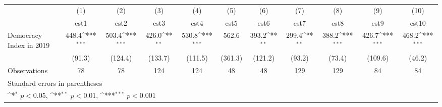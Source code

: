 {
\def\sym#1{\ifmmode^{#1}\else\(^{#1}\)\fi}
\begin{tabular}{l*{10}{c}}
\hline\hline
                    &\multicolumn{1}{c}{(1)}         &\multicolumn{1}{c}{(2)}         &\multicolumn{1}{c}{(3)}         &\multicolumn{1}{c}{(4)}         &\multicolumn{1}{c}{(5)}         &\multicolumn{1}{c}{(6)}         &\multicolumn{1}{c}{(7)}         &\multicolumn{1}{c}{(8)}         &\multicolumn{1}{c}{(9)}         &\multicolumn{1}{c}{(10)}         \\
                    &        est1         &        est2         &        est3         &        est4         &        est5         &        est6         &        est7         &        est8         &        est9         &       est10         \\
\hline
Democracy Index in 2019&       448.4\sym{***}&       503.4\sym{***}&       426.0\sym{**} &       530.8\sym{***}&       562.6         &       393.2\sym{**} &       299.4\sym{**} &       388.2\sym{***}&       426.7\sym{***}&       468.2\sym{***}\\
                    &      (91.3)         &     (124.4)         &     (133.7)         &     (111.5)         &     (361.3)         &     (121.2)         &      (93.2)         &      (73.4)         &     (109.6)         &      (46.2)         \\
\hline
Observations        &          78         &          78         &         124         &         124         &          48         &          48         &         129         &         129         &          84         &          84         \\
\hline\hline
\multicolumn{11}{l}{\footnotesize Standard errors in parentheses}\\
\multicolumn{11}{l}{\footnotesize \sym{*} \(p<0.05\), \sym{**} \(p<0.01\), \sym{***} \(p<0.001\)}\\
\end{tabular}
}
